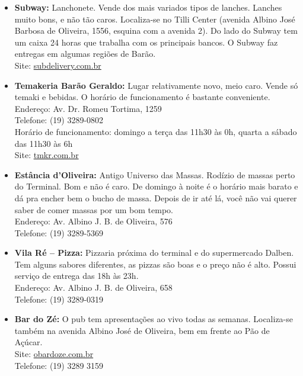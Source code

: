 \begin{itemize}
    \item   \textbf{Subway:} Lanchonete. Vende dos mais variados tipos de
        lanches.  Lanches muito bons, e não tão caros. Localiza-se no Tilli
        Center (avenida Albino José Barbosa de Oliveira, 1556, esquina com a
        avenida 2). Do lado do Subway tem um caixa 24 horas que trabalha com os
        principais bancos. O Subway faz entregas em algumas regiões de Barão.
        \\Site: \url{subdelivery.com.br}

      \item \textbf{Temakeria Barão Geraldo:} Lugar relativamente novo, meio
        caro. Vende só temaki e bebidas. O horário de funcionamento é bastante
        conveniente.  
        \\Endereço: Av. Dr. Romeu Tortima, 1259 
        \\Telefone: (19) 3289-0802 
        \\Horário de funcionamento: domingo a terça das 11h30 às 0h, quarta a
        sábado das 11h30 às 6h 
        \\Site: \url{tmkr.com.br}

    \item   \textbf{Estância d'Oliveira:} Antigo Universo das Massas. Rodízio de
        massas perto do Terminal. Bom e não é caro. De domingo à noite é o
        horário mais barato e dá pra encher bem o bucho de massa. Depois de ir
        até lá, você não vai querer saber de comer massas por um bom tempo.
        \\Endereço: Av. Albino J. B. de Oliveira, 576
        \\Telefone: (19) 3289-5369 

    \item   \textbf{Vila Ré -- Pizza:} Pizzaria próxima do terminal e do
        supermercado Dalben. Tem alguns sabores diferentes, as pizzas são boas e
        o preço não é alto. Possui serviço de entrega das 18h às 23h.
        \\Endereço: Av. Albino J. B. de Oliveira, 658
        \\Telefone: (19) 3289-0319 %

    \item   \textbf{Bar do Zé:} O pub tem apresentações ao vivo todas as
        semanas.  Localiza-se também na avenida Albino José de Oliveira, bem em
        frente ao Pão de Açúcar.
        \\Site: \url{obardoze.com.br}
        \\Telefone: (19) 3289 3159


\end{itemize}
